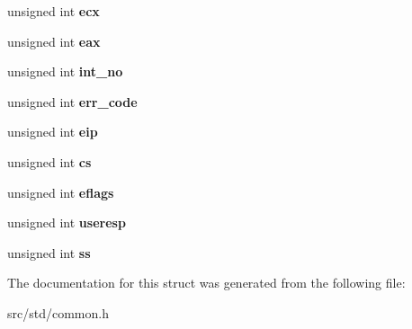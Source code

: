 \begin{DoxyCompactItemize}
\mbox{\label{structregisters_a78b334cba04e9f86caee3c1adb1cbe21}} 
unsigned int {\bfseries ecx}
\item 
\mbox{\label{structregisters_a9bfb168195a7f07462400928e3c0734e}} 
unsigned int {\bfseries eax}
\item 
\mbox{\label{structregisters_a10d329596300f18be2c275848421bac5}} 
unsigned int {\bfseries int\+\_\+no}
\item 
\mbox{\label{structregisters_a01c8c81e7fa2f1f40ac20da1b7f4998a}} 
unsigned int {\bfseries err\+\_\+code}
\item 
\mbox{\label{structregisters_a832d2f2dfd7fac577a2d64bee0edcc62}} 
unsigned int {\bfseries eip}
\item 
\mbox{\label{structregisters_a9220a7a9709333e7c0073291d921b506}} 
unsigned int {\bfseries cs}
\item 
\mbox{\label{structregisters_a87d1480ee272b093f338a8bdb6d6230c}} 
unsigned int {\bfseries eflags}
\item 
\mbox{\label{structregisters_a4f4b014f164f722c19a5927779fb227a}} 
unsigned int {\bfseries useresp}
\item 
\mbox{\label{structregisters_a2228d9d50e171ef1c36fad576bed4665}} 
unsigned int {\bfseries ss}
\end{DoxyCompactItemize}


The documentation for this struct was generated from the following file\+:\begin{DoxyCompactItemize}
\item 
src/std/common.\+h\end{DoxyCompactItemize}
